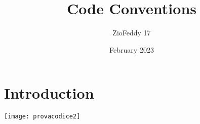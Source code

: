 \documentclass{article}
\title{Code Conventions}
\author{ZioFeddy 17}
\date{February 2023}
\begin{document}
\maketitle

\section{Introduction}
\texttt{[image: provacodice2]}
\end{document}
